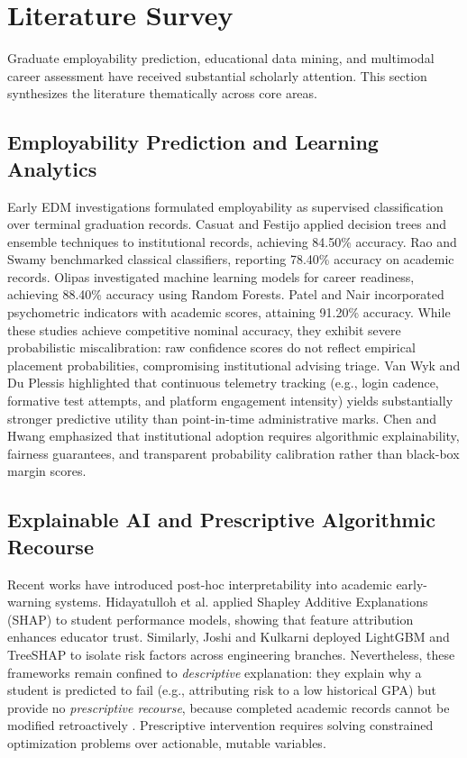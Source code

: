 \documentclass[conference]{IEEEtran}
\begin{document}
\section{Literature Survey}

Graduate employability prediction, educational data mining, and multimodal career assessment have received substantial scholarly attention. This section synthesizes the literature thematically across core areas.

\subsection{Employability Prediction and Learning Analytics}
Early EDM investigations formulated employability as supervised classification over terminal graduation records. Casuat and Festijo \cite{b7} applied decision trees and ensemble techniques to institutional records, achieving 84.50\% accuracy. Rao and Swamy \cite{b8} benchmarked classical classifiers, reporting 78.40\% accuracy on academic records. Olipas \cite{b1} investigated machine learning models for career readiness, achieving 88.40\% accuracy using Random Forests. Patel and Nair \cite{b4} incorporated psychometric indicators with academic scores, attaining 91.20\% accuracy. While these studies achieve competitive nominal accuracy, they exhibit severe probabilistic miscalibration: raw confidence scores do not reflect empirical placement probabilities, compromising institutional advising triage. Van Wyk and Du Plessis \cite{b2} highlighted that continuous telemetry tracking (e.g., login cadence, formative test attempts, and platform engagement intensity) yields substantially stronger predictive utility than point-in-time administrative marks. Chen and Hwang \cite{b5} emphasized that institutional adoption requires algorithmic explainability, fairness guarantees, and transparent probability calibration rather than black-box margin scores.

\subsection{Explainable AI and Prescriptive Algorithmic Recourse}
Recent works have introduced post-hoc interpretability into academic early-warning systems. Hidayatulloh et al. \cite{b16} applied Shapley Additive Explanations (SHAP) to student performance models, showing that feature attribution enhances educator trust. Similarly, Joshi and Kulkarni \cite{b17} deployed LightGBM and TreeSHAP to isolate risk factors across engineering branches. Nevertheless, these frameworks remain confined to \textit{descriptive} explanation: they explain why a student is predicted to fail (e.g., attributing risk to a low historical GPA) but provide no \textit{prescriptive recourse}, because completed academic records cannot be modified retroactively \cite{b16,b17}. Prescriptive intervention requires solving constrained optimization problems over actionable, mutable variables.
\end{document}
